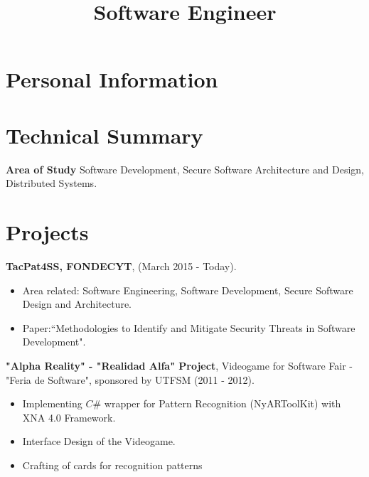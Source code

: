 \documentclass[10pt,a4paper,sans]{moderncv}        %
\title{Software Engineer}
\begin{document}
\makecvtitle


\section{Personal Information}

\section{Technical Summary}
    \vspace{1 mm}
    \textbf{Area of Study} \-\hspace{0.15cm}Software Development, Secure Software Architecture and Design, Distributed Systems.

\section{Projects}
\textbf{TacPat4SS, FONDECYT}, (March 2015 - Today).
\begin{itemize}
	\item Area related: Software Engineering, Software Development, Secure Software Design and Architecture.
	\item Paper:``Methodologies to Identify and Mitigate Security Threats in Software Development".
\end{itemize}
\vspace{3 mm}
\textbf{"Alpha Reality" - "Realidad Alfa" Project}, Videogame for Software Fair - "Feria de Software", sponsored by UTFSM (2011 - 2012).
\begin{itemize}
	\item Implementing \(C\#\) wrapper for Pattern Recognition (NyARToolKit) with XNA 4.0 Framework.
	\item Interface Design of the Videogame.
	\item Crafting of cards for recognition patterns
\end{itemize}
\end{document}
